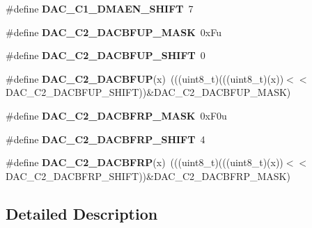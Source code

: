 \begin{DoxyCompactItemize}
\item 
\#define {\bfseries D\+A\+C\+\_\+\+C1\+\_\+\+D\+M\+A\+E\+N\+\_\+\+S\+H\+I\+FT}~7\hypertarget{group__DAC__Register__Masks_ga481f558223c5c36402bebe924bdd00a3}{}\label{group__DAC__Register__Masks_ga481f558223c5c36402bebe924bdd00a3}

\item 
\#define {\bfseries D\+A\+C\+\_\+\+C2\+\_\+\+D\+A\+C\+B\+F\+U\+P\+\_\+\+M\+A\+SK}~0x\+Fu\hypertarget{group__DAC__Register__Masks_ga329015367026aaee34f54edcbaab61bb}{}\label{group__DAC__Register__Masks_ga329015367026aaee34f54edcbaab61bb}

\item 
\#define {\bfseries D\+A\+C\+\_\+\+C2\+\_\+\+D\+A\+C\+B\+F\+U\+P\+\_\+\+S\+H\+I\+FT}~0\hypertarget{group__DAC__Register__Masks_ga5d43a79719748e490a572fa6cdc75efe}{}\label{group__DAC__Register__Masks_ga5d43a79719748e490a572fa6cdc75efe}

\item 
\#define {\bfseries D\+A\+C\+\_\+\+C2\+\_\+\+D\+A\+C\+B\+F\+UP}(x)~(((uint8\+\_\+t)(((uint8\+\_\+t)(x))$<$$<$D\+A\+C\+\_\+\+C2\+\_\+\+D\+A\+C\+B\+F\+U\+P\+\_\+\+S\+H\+I\+FT))\&D\+A\+C\+\_\+\+C2\+\_\+\+D\+A\+C\+B\+F\+U\+P\+\_\+\+M\+A\+SK)\hypertarget{group__DAC__Register__Masks_ga8047d00b752e60690bae95e47bd8d75e}{}\label{group__DAC__Register__Masks_ga8047d00b752e60690bae95e47bd8d75e}

\item 
\#define {\bfseries D\+A\+C\+\_\+\+C2\+\_\+\+D\+A\+C\+B\+F\+R\+P\+\_\+\+M\+A\+SK}~0x\+F0u\hypertarget{group__DAC__Register__Masks_ga64b53e5effabf2e736fca6088752e6ea}{}\label{group__DAC__Register__Masks_ga64b53e5effabf2e736fca6088752e6ea}

\item 
\#define {\bfseries D\+A\+C\+\_\+\+C2\+\_\+\+D\+A\+C\+B\+F\+R\+P\+\_\+\+S\+H\+I\+FT}~4\hypertarget{group__DAC__Register__Masks_ga0ab880f693c25ecf491d3b76df611456}{}\label{group__DAC__Register__Masks_ga0ab880f693c25ecf491d3b76df611456}

\item 
\#define {\bfseries D\+A\+C\+\_\+\+C2\+\_\+\+D\+A\+C\+B\+F\+RP}(x)~(((uint8\+\_\+t)(((uint8\+\_\+t)(x))$<$$<$D\+A\+C\+\_\+\+C2\+\_\+\+D\+A\+C\+B\+F\+R\+P\+\_\+\+S\+H\+I\+FT))\&D\+A\+C\+\_\+\+C2\+\_\+\+D\+A\+C\+B\+F\+R\+P\+\_\+\+M\+A\+SK)\hypertarget{group__DAC__Register__Masks_ga63520cda0dd201e556b139f064b82ee3}{}\label{group__DAC__Register__Masks_ga63520cda0dd201e556b139f064b82ee3}

\end{DoxyCompactItemize}


\subsection{Detailed Description}

